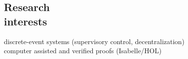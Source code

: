 \documentclass[margin]{res}
\newcommand{\fullhrulefill}{%
  \hspace*{-\sectionwidth}\hrulefill%
  }
\def\theyear{#2#3#4#5}%
\def\themonth{#6#7}%
\def\theday{#8#9}%
\def\thehour{#1#2}%
\def\theminute{#3#4}%
\def\thesecond{#5#6}%
\def\thetimezonehour{+00}%
\def\thetimezoneminute{00}%
\def\thetimezonehour{#1}%
\def\thetimezoneminute{#2}%
\newcommand*{\thetimezone}{\thetimezonehour:\thetimezoneminute}
\begin{document}
\begin{resume}

\fullhrulefill







\section{Research\\interests}
discrete-event systems (supervisory control, decentralization) \\
computer assisted and verified proofs (Isabelle/HOL)


\end{resume}
\end{document}
